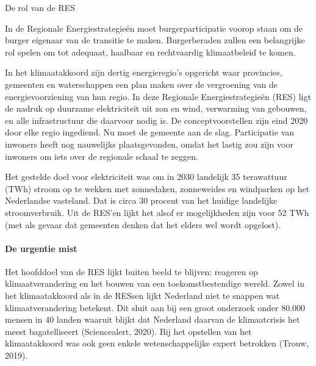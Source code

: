 \begin{voorstel}{De rol van de RES}


\begin{samenvatting}
In de Regionale Energiestrategieën moet burgerparticipatie voorop staan om de burger eigenaar van de transitie te maken. Burgerberaden zullen een belangrijke rol spelen om tot adequaat, haalbaar en rechtvaardig klimaatbeleid te komen.
\end{samenvatting}

\begin{multicols*}{2}

\begin{uitdaging}
In het klimaatakkoord zijn dertig energieregio’s opgericht waar provincies, gemeenten en waterschappen een plan maken over de vergroening van de energievoorziening van hun regio. In deze Regionale Energiestrategieën (RES) ligt de nadruk op duurzame elektriciteit uit zon en wind, verwarming van gebouwen, en alle infrastructuur die daarvoor nodig is. De conceptvoorstellen zijn eind 2020 door elke regio ingediend. Nu moet de gemeente aan de slag. Participatie van inwoners heeft nog nauwelijks plaatsgevonden, omdat het lastig zou zijn voor inwoners om iets over de regionale schaal te zeggen.
\end{uitdaging}

\begin{overwegingen}
Het gestelde doel voor elektriciteit was om in 2030 landelijk 35 terawattuur (TWh) stroom op te wekken met zonnedaken, zonneweides en windparken op het Nederlandse vasteland. Dat is circa 30 procent van het huidige landelijke stroomverbruik. Uit de RES’en lijkt het alsof er mogelijkheden zijn voor 52 TWh (met als gevaar dat gemeenten denken dat het elders wel wordt opgelost).


\paragraph{De urgentie mist}
Het hoofddoel van de RES lijkt buiten beeld te blijven: reageren op klimaatverandering en het bouwen van een toekomstbestendige wereld. Zowel in het klimaatakkoord als in de RESsen lijkt Nederland niet te snappen wat klimaatverandering betekent. Dit sluit aan bij een groot onderzoek onder 80.000 mensen in 40 landen waaruit blijkt dat Nederland daarvan de klimaatcrisis het meest bagatelliseert (Sciencealert, 2020). Bij het opstellen van het klimaatakkoord was ook geen enkele wetenschappelijke expert betrokken (Trouw, 2019).


\end{overwegingen}
\end{multicols*}
\end{voorstel}
